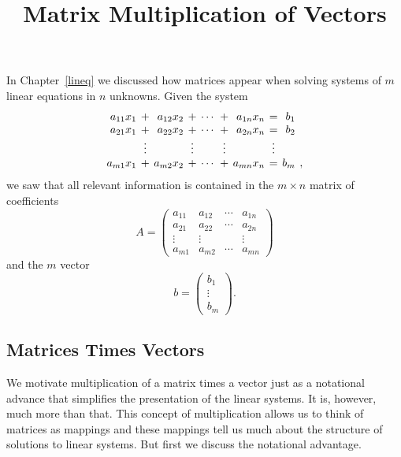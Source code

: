 \documentclass{ximera}
\title{Matrix Multiplication of Vectors}
\begin{document}
\begin{abstract}
\end{abstract}
\maketitle

 \label{S:4.1}

In Chapter~\ref{lineq} we discussed how matrices appear when solving systems 
of $m$ linear equations in $n$ unknowns.  Given the system
\begin{equation}   \label{general2}
\arraycolsep 2pt
\begin{array}{rcrcrcrcrl}
a_{11}x_1 & + & a_{12}x_2 & + & \cdots & + & a_{1n}x_n & = & b_1 & \\
a_{21}x_1 & + & a_{22}x_2 & + & \cdots & + & a_{2n}x_n & = & b_2 & \\
    & \vdots &      & \vdots &    & \vdots &     & \vdots &   & \\
a_{m1}x_1 & + & a_{m2}x_2 & + & \cdots & + & a_{mn}x_n & = & b_m & ,
\end{array}
\end{equation}
we saw that all relevant information is contained in the $m\times n$ matrix 
of coefficients
\[
A=\left(
\begin{array}{rrrr}
 a_{11} & a_{12} & \cdots & a_{1n} \\
 a_{21} & a_{22} & \cdots & a_{2n}  \\
 \vdots & \vdots &        & \vdots  \\
 a_{m1} & a_{m2} & \cdots & a_{mn}
\end{array}
\right)
\]
and the $m$ vector
\[
b=\left(
\begin{array}{c}
b_1 \\ \vdots \\ b_m
\end{array}
\right).
\]



\subsection*{Matrices Times Vectors}

We motivate multiplication of a matrix times a vector just as a notational 
advance that simplifies the
presentation of the linear systems.  It is, however, much more
than that.  This concept of multiplication allows us to think of
matrices as mappings and these mappings tell us much about the
structure of solutions to linear systems.  But first we discuss
the notational advantage.
\end{document}
